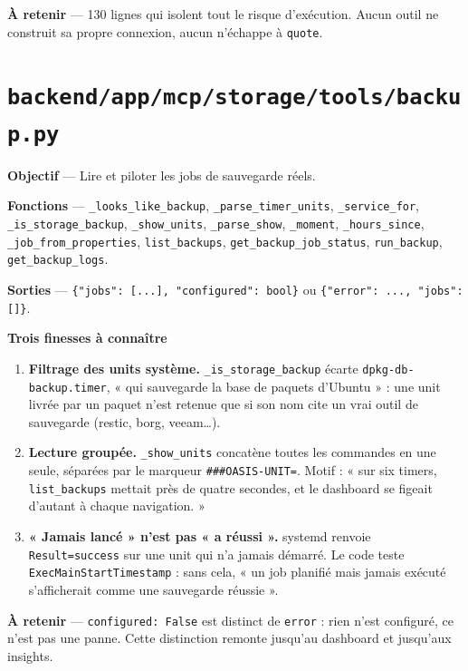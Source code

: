 \documentclass[11pt,a4paper]{report}
\newcommand{\file}[1]{\texttt{\small #1}}
\newcommand{\fn}[1]{\texttt{\small\textcolor{oasisviolet}{#1}}}
\begin{document}
\textbf{À retenir} --- 130 lignes qui isolent tout le risque d'exécution. Aucun
outil ne construit sa propre connexion, aucun n'échappe à \fn{quote}.

\section{\file{backend/app/mcp/storage/tools/backup.py}}

\textbf{Objectif} --- Lire et piloter les jobs de sauvegarde réels.

\textbf{Fonctions} --- \fn{\_looks\_like\_backup}, \fn{\_parse\_timer\_units},
\fn{\_service\_for}, \fn{\_is\_storage\_backup}, \fn{\_show\_units},
\fn{\_parse\_show}, \fn{\_moment}, \fn{\_hours\_since},
\fn{\_job\_from\_properties}, \fn{list\_backups}, \fn{get\_backup\_job\_status},
\fn{run\_backup}, \fn{get\_backup\_logs}.

\textbf{Sorties} --- \texttt{\{"jobs": [...], "configured": bool\}} ou
\texttt{\{"error": ..., "jobs": []\}}.

\textbf{Trois finesses à connaître}
\begin{enumerate}
  \item \textbf{Filtrage des units système.} \fn{\_is\_storage\_backup} écarte
  \texttt{dpkg-db-backup.timer}, « qui sauvegarde la base de paquets d'Ubuntu »
  : une unit livrée par un paquet n'est retenue que si son nom cite un vrai
  outil de sauvegarde (restic, borg, veeam\ldots).
  \item \textbf{Lecture groupée.} \fn{\_show\_units} concatène toutes les
  commandes en une seule, séparées par le marqueur
  \texttt{\#\#\#OASIS-UNIT=}. Motif : « sur six timers, \fn{list\_backups}
  mettait près de quatre secondes, et le dashboard se figeait d'autant à chaque
  navigation. »
  \item \textbf{« Jamais lancé » n'est pas « a réussi ».} systemd renvoie
  \texttt{Result=success} sur une unit qui n'a jamais démarré. Le code teste
  \texttt{ExecMainStartTimestamp} : sans cela, « un job planifié mais jamais
  exécuté s'afficherait comme une sauvegarde réussie ».
\end{enumerate}

\textbf{À retenir} --- \texttt{configured: False} est distinct de
\texttt{error} : rien n'est configuré, ce n'est pas une panne. Cette distinction
remonte jusqu'au dashboard et jusqu'aux insights.

\end{document}
